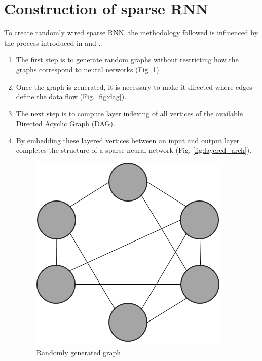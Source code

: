 \documentclass[acmlarge,screen,natbib=false]{acmart}
\begin{document}
\section{Construction of sparse RNN} \label{construct_sparse_rnn}
To create randomly wired sparse RNN, the methodology followed is influenced by the process introduced in \cite{julian} and \cite{randnn}.
\begin{enumerate}[	1.]
	\item The first step is to generate random graphs without restricting how the graphs correspond to neural networks (Fig. \ref{fig:rgg}).
	\item Once the graph is generated, it is necessary to make it directed where edges define the data flow (Fig. \ref{fig:dag}).
	\item The next step is to compute layer indexing of all vertices of the available Directed Acyclic Graph (DAG).
	\item By embedding these layered vertices between an input and output layer completes the structure of a sparse neural network (Fig. \ref{fig:layered_arch}).
	\begin{figure}[h!]
			\begin{center}
				\includegraphics[scale=0.5]{rgg.png}
			\end{center}
  			\caption{Randomly generated graph \cite{julian}}
  			\label{fig:rgg}
		\endminipage\hfill
			\begin{center}

\end{center}
\end{figure}
\end{enumerate}
\end{document}
